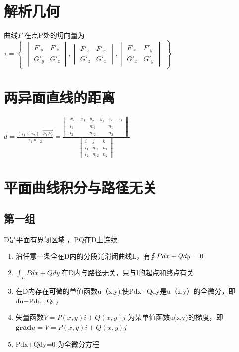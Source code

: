 \documentclass[UTF8]{ctexart}
\begin{document}
\section{解析几何}
曲线$\Gamma $ 在点P处的切向量为
$ \tau =
\begin{Bmatrix}

\begin{vmatrix}
F'_y & F'_z \\
G'_y & G'_z
\end{vmatrix}
,
\begin{vmatrix}
F'_z & F'_x \\
G'_z & G'_x
\end{vmatrix}
,
\begin{vmatrix}
F'_x & F'_y \\
G'_x & G'_y
\end{vmatrix}
\end{Bmatrix}
$

\section{两异面直线的距离}
$ d= \frac{ (\tau_1 \times \tau_2)\cdot \overrightarrow{P_1 P_2}}{\tau_1 \times \tau_2} = \frac{\begin{Vmatrix}
x_2-x_1 & y_2-y_1 & z_2-z_1 \\
l_1 & m_1 & n_1 \\
l_2 & m_2 & n_2
\end{Vmatrix}}{\begin{Vmatrix}
  i & j & k \\
  l_1 & m_1 & n_1 \\
  l_2 & m_2 & n_2
\end{Vmatrix}}
$

\section{平面曲线积分与路径无关}
\subsection{第一组}
D是平面有界闭区域 ，PQ在D上连续
\begin{enumerate}
  \item 沿任意一条全在D内的分段光滑闭曲线L，有$\ointop P dx + Q dy =0$
  \item $\int_L Pdx+Qdy $ 在D内与路径无关，只与l的起点和终点有关
  \item 在D内存在可微的单值函数u（x,y),使Pdx+Qdy是u（x,y）的全微分，即du=Pdx+Qdy
  \item 矢量函数$V=P(x,y)\mathit{i}+Q(x,y)\mathit{j}$ 为某单值函数u(x,y)的梯度，即 $\mathbf{grad}u=V=P(x,y)\mathit{i}+Q(x,y)\mathit{j}$
  \item Pdx+Qdy=0 为全微分方程
\end{enumerate}
\end{document}
